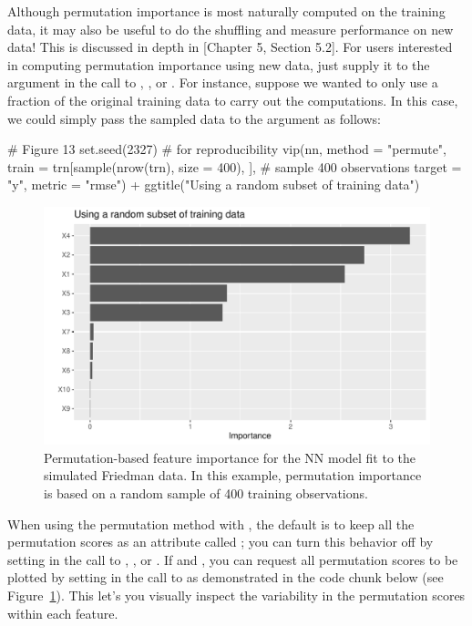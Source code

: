 Although permutation importance is most naturally computed on the training data, it may also be useful to do the shuffling and measure performance on new data! This is discussed in depth in \citet{molnar-2019-iml}[Chapter 5, Section 5.2]. For users interested in computing permutation importance using new data, just supply it to the  argument in the call to , , or . For instance, suppose we wanted to only use a fraction of the original training data to carry out the computations. In this case, we could simply pass the sampled data to the  argument as follows:

\begin{example}
# Figure 13
set.seed(2327)  # for reproducibility
vip(nn, method = "permute", 
    train = trn[sample(nrow(trn), size = 400), ],  # sample 400 observations
    target = "y", metric = "rmse") +
  ggtitle("Using a random subset of training data")
\end{example}

\begin{figure}[!htb]
  \centering
  \includegraphics[width=1\linewidth]{figures/vip-permute-nn-sample}
  \caption{Permutation-based feature importance for the NN model fit to the simulated Friedman data. In this example, permutation importance is based on a random sample of 400 training observations.}
  \label{fig:vip-nn-mae}
\end{figure}

When using the permutation method with , the default is to keep all the permutation scores as an attribute called ; you can turn this behavior off by setting  in the call to , , or . If  and , you can request all permutation scores to be plotted by setting  in the call to  as demonstrated in the code chunk below (see Figure~\ref{fig:vip-nn-mae}). This let's you visually inspect the variability in the permutation scores within each feature.

